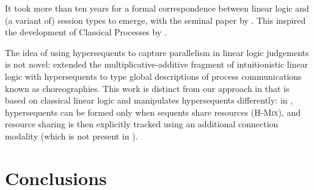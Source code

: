 \documentclass[draft,submission,copyright,creativecommons]{eptcs}
\begin{document}
It took more than ten years for a formal correspondence between linear logic and
(a variant of) session types to emerge, with the seminal paper by \citet{caires2010}.
This inspired the development of Classical Processes by \citet{wadler2012}.

The idea of using hypersequents to capture parallelism in linear logic judgements is not
novel: \citet{carbone2018} extended the multiplicative-additive fragment
of intuitionistic linear logic with hypersequents to type global descriptions of
process communications known as choreographies.
This work is distinct from our approach in that \hcp is based on classical linear
logic and manipulates hypersequents differently: in \citet{carbone2018}, hypersequents can be formed only when sequents share
resources (\cf \textsc{H-Mix}), and resource sharing is then explicitly tracked
using an additional connection modality (which is not present in \hcp).

\section{Conclusions}
\label{sec:conclusions}

\clearpage


\end{document}
